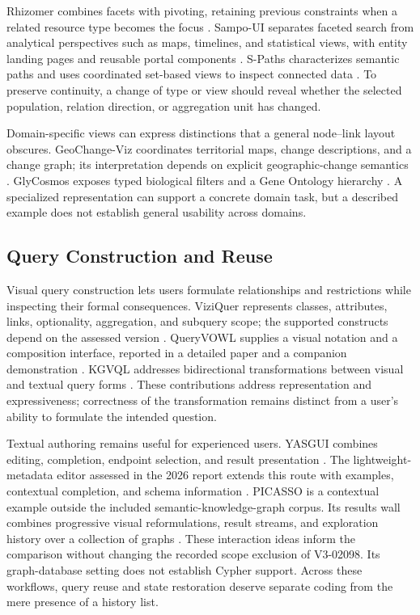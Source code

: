 \documentclass[manuscript,review,screen]{acmart}
\begin{document}
Rhizomer combines facets with pivoting, retaining previous constraints when a related resource type becomes the focus \citep{V3-01105}. Sampo-UI separates faceted search from analytical perspectives such as maps, timelines, and statistical views, with entity landing pages and reusable portal components \citep{2022_Ikkala_Sampo-UI_A}. S-Paths characterizes semantic paths and uses coordinated set-based views to inspect connected data \citep{2021_Destandau_S-Paths_Set-based}. To preserve continuity, a change of type or view should reveal whether the selected population, relation direction, or aggregation unit has changed.

Domain-specific views can express distinctions that a general node--link layout obscures. GeoChange-Viz coordinates territorial maps, change descriptions, and a change graph; its interpretation depends on explicit geographic-change semantics \citep{V3-01218}. GlyCosmos exposes typed biological filters and a Gene Ontology hierarchy \citep{V3-01242}. A specialized representation can support a concrete domain task, but a described example does not establish general usability across domains.

\subsection{Query Construction and Reuse}
Visual query construction lets users formulate relationships and restrictions while inspecting their formal consequences. ViziQuer represents classes, attributes, links, optionality, aggregation, and subquery scope; the supported constructs depend on the assessed version \citep{2018_Cerans_ViziQuer_A,V3-01077}. QueryVOWL supplies a visual notation and a composition interface, reported in a detailed paper and a companion demonstration \citep{V3-02190,V3-02191}. KGVQL addresses bidirectional transformations between visual and textual query forms \citep{V3-01623}. These contributions address representation and expressiveness; correctness of the transformation remains distinct from a user's ability to formulate the intended question.

Textual authoring remains useful for experienced users. YASGUI combines editing, completion, endpoint selection, and result presentation \citep{2013_Rietveld_YASGUI_Not}. The lightweight-metadata editor assessed in the 2026 report extends this route with examples, contextual completion, and schema information \citep{2025_Emonet_A_User-Friendly}. PICASSO is a contextual example outside the included semantic-knowledge-graph corpus. Its results wall combines progressive visual reformulations, result streams, and exploration history over a collection of graphs \citep{2017_Huang_PICASSO_exploratory}. These interaction ideas inform the comparison without changing the recorded scope exclusion of V3-02098. Its graph-database setting does not establish Cypher support. Across these workflows, query reuse and state restoration deserve separate coding from the mere presence of a history list.
\end{document}
